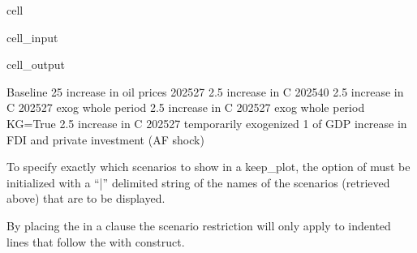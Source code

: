 \documentclass[letterpaper,10pt,english]{jupyterBook}
\begin{document}
\begin{sphinxuseclass}{cell}\begin{sphinxVerbatimInput}

\begin{sphinxuseclass}{cell_input}
\begin{sphinxVerbatim}[commandchars=\\\{\}]
\end{sphinxVerbatim}

\end{sphinxuseclass}\end{sphinxVerbatimInput}
\begin{sphinxVerbatimOutput}

\begin{sphinxuseclass}{cell_output}
\begin{sphinxVerbatim}[commandchars=\\\{\}]
Baseline
\PYGZdl{}25 increase in oil prices 2025\PYGZhy{}27
2.5\PYGZpc{} increase in C 2025\PYGZhy{}40
2.5\PYGZpc{} increase in C 2025\PYGZhy{}27 \PYGZhy{}\PYGZhy{} exog whole period
2.5\PYGZpc{} increase in C 2025\PYGZhy{}27 \PYGZhy{}\PYGZhy{} exog whole period \PYGZhy{}\PYGZhy{}KG=True
2.5\PYGZpc{} increase in C 2025\PYGZhy{}27 \PYGZhy{}\PYGZhy{} temporarily exogenized
1\PYGZpc{} of GDP increase in FDI and private investment (AF shock)
\end{sphinxVerbatim}

\end{sphinxuseclass}\end{sphinxVerbatimOutput}

\end{sphinxuseclass}
\sphinxAtStartPar
To specify exactly which scenarios to show in a keep\_plot, the  option of  must be initialized with a “|” delimited string of the names of the scenarios (retrieved above) that are to be displayed.

\sphinxAtStartPar
By placing the  in a  clause the scenario restriction will only apply to indented lines that follow the with construct.
\end{document}

